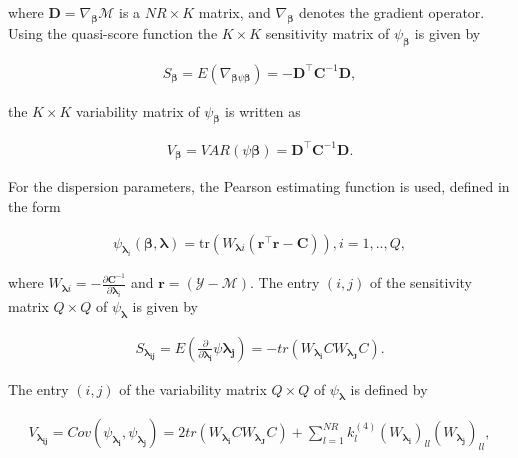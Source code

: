 \documentclass[USenglish]{article}
\theoremstyle{dgthm}
\theoremstyle{dgdef}
\begin{document}
\noindent where $\boldsymbol{D} = \nabla_{\boldsymbol{\beta}} \mathcal{M}$ is a $NR \times K$ matrix, and $\nabla_{\boldsymbol{\beta}}$ denotes the gradient operator. Using the quasi-score function the $K \times K$ sensitivity matrix of $\psi_{\boldsymbol{\beta}}$ is given by

$$
\begin{aligned}
S_{\boldsymbol{\beta}} = E(\nabla_{\boldsymbol{\beta} \psi \boldsymbol{\beta}}) = -\boldsymbol{D}^{\top} \boldsymbol{C}^{-1} \boldsymbol{D},
\end{aligned}
$$

\noindent the $K \times K$ variability matrix of $\psi_{\boldsymbol{\beta}}$ is written as

$$
\begin{aligned}
V_{\boldsymbol{\beta}} = VAR(\psi \boldsymbol{\beta}) = \boldsymbol{D}^{\top} \boldsymbol{C}^{-1} \boldsymbol{D}.
\end{aligned}
$$

For the dispersion parameters, the Pearson estimating function is used, defined in the form

$$
  \begin{aligned}
    \psi_{\boldsymbol{\lambda}_i}(\boldsymbol{\beta},
    \boldsymbol{\lambda}) =
    \mathrm{tr}(W_{\boldsymbol{\lambda}i}
    (\boldsymbol{r}^\top\boldsymbol{r} -
    \boldsymbol{C})),  i = 1,.., Q, 
  \end{aligned}
$$

\noindent where $W_{\boldsymbol{\lambda}i} = -\frac{\partial \boldsymbol{C}^{-1}}{\partial \boldsymbol{\lambda}_i}$ and $\boldsymbol{ r} = (\mathcal{Y} - \mathcal{M})$. The entry $(i,j)$ of the sensitivity matrix $Q \times Q$ of $\psi_{\boldsymbol{\lambda}}$ is given by

$$
  \begin{aligned}
    S_{\boldsymbol{\lambda_{ij}}} = E \left (\frac{\partial }{\partial \boldsymbol{\lambda_{i}}} \psi \boldsymbol{\lambda_{j}}\right) = -tr(W_{\boldsymbol{\lambda_{i}}} CW_{\boldsymbol{\lambda_{J}}} C).
  \end{aligned}
$$

\noindent The entry $(i,j)$ of the variability matrix $Q \times Q$ of $\psi_{\boldsymbol{\lambda}}$ is defined by

$$
  \begin{aligned}
V_{\boldsymbol{\lambda_{ij}}} = Cov\left ( \psi_{\boldsymbol{\lambda_{i}}}, \psi_{\boldsymbol{\lambda_{j}}} \right) = 2tr(W_{\boldsymbol{\lambda_{i}}} CW_{\boldsymbol{\lambda_{J}}} C) + \sum_{l=1}^{NR} k_{l}^{(4)} (W_{\boldsymbol{\lambda_{i}}})_{ll} (W_{\boldsymbol{\lambda_{j}}})_{ll},
  \end{aligned}
$$
\end{document}
